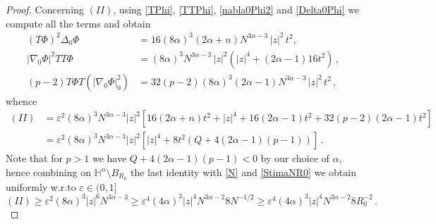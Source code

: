 \documentclass[10pt]{amsart}
\numberwithin{equation}{section}
\theoremstyle{definition}
\newcommand{\eps}{\varepsilon}
\newcommand{\He}{\mathbb{H}}
\newcommand{\hgrad}{\nabla_{\mathnormal{H}}}
\newcommand{\hLap}{\Delta_{\mathnormal{H}}}
\newcommand{\hnorm}[1]{\|{#1}\|_{\mathnormal{H}}}
\begin{document}
\begin{proof}
\noindent Concerning $(II)$, using \eqref{TPhi}, \eqref{TTPhi}, \eqref{nabla0Phi2} and \eqref{Delta0Phi} we compute all the terms and obtain
\begin{align*}
(T\Phi)^2 \Delta_0 \Phi &= 16 (8\alpha)^3 (2\alpha +n) N^{3\alpha -3}\, |z|^2 \, t^2,\\
|\nabla_0 \Phi|^2 TT\Phi &= (8 \alpha)^3  N^{3\alpha -3}\, |z|^2 (|z|^4 + (2\alpha-1)16t^2) \, ,\\
(p-2)T\Phi T \left( |\nabla_0 \Phi|^2_0\right)&= 32  (p-2) (8\alpha)^3 (2\alpha -1)N^{3\alpha -3} \, |z|^2 \, t^2 \, ,
\end{align*}  
whence
\begin{equation}
\label{eq:II}
\begin{aligned}(II)&=\varepsilon^2 (8 \alpha)^3 N^{3\alpha-3}|z|^2 \left[ 16 (2\alpha+n) t^2+ |z|^4+16(2\alpha-1)t^2 +32(p-2)(2\alpha-1) t^2\right]\\
&=\varepsilon^2 (8 \alpha)^3 N^{3\alpha-3}|z|^2 \left[ |z|^4+ 8t^2(Q+4(2\alpha-1)(p-1))\right] \, .
\end{aligned}
\end{equation}
Note that for $p>1$ we have $Q+4(2\alpha-1)(p-1)<0$ by our choice of $\alpha$, hence combining on $\He^n\setminus B_{R_0}$ the last identity with \eqref{N} and \eqref{StimaNR0} we obtain uniformly w.r.to $\varepsilon \in (0,1]$
\begin{equation}
\label{ineq(2)}
(II) \geq  \varepsilon^2 (8 \alpha)^3 |z|^6 N^{3\alpha-3}  \geq \varepsilon^4 (4 \alpha)^3 |z|^4 N^{3\alpha-2} 8 N^{-1/2} \geq \varepsilon^4 (4 \alpha)^3 |z|^4 N^{3\alpha-2} 8 R_0^{-2}\, .
\end{equation} 


\end{proof}
\end{document}
